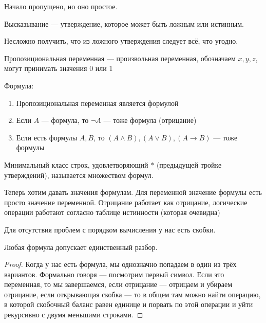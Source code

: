 
Начало пропущено, но оно простое.

Высказывание --- утверждение, которое может быть ложным или истинным.

Несложно получить, что из ложного утверждения следует всё, что угодно.

\begin{definition}
Пропозициональная переменная --- произвольная переменная, обозначаем $x, y, z$, могут принимать значения 0 или 1
\end{definition}

\begin{definition}
Формула: 

\begin{enumerate}
	\item{Пропозициональная переменная является формулой}

	\item{Если $A$ --- формула, то $\lnot A$ --- тоже формула (отрицание)}

	\item{Если есть формулы $A, B$, то $(A \land B), (A \lor B), (A \to B)$ --- тоже формулы}

\end{enumerate}

Минимальный класс строк, удовлетворяющий $*$ (предыдущей тройке утверждений), называется множеством формул.

\end{definition}

Теперь хотим давать значения формулам. Для переменной значение формулы есть просто значение переменной. Отрицание работает как отрицание, логические операции работают согласно таблице истинности (которая очевидна)

Для отсутствия проблем с порядком вычисления у нас есть скобки.

\begin{theorem}
	Любая формула допускает единственный разбор.
\end{theorem}
\begin{proof}
	Когда у нас есть формула, мы однозначно попадаем в один из трёх вариантов. Формально говоря --- посмотрим первый символ. Если это переменная, то мы завершаемся, если отрицание --- отрицаем и убираем отрицание, если открывающая скобка --- то в общем там можно найти операцию, в которой скобочный баланс равен единице и порвать по этой операции и уйти рекурсивно с двумя меньшими строками.
\end{proof}

